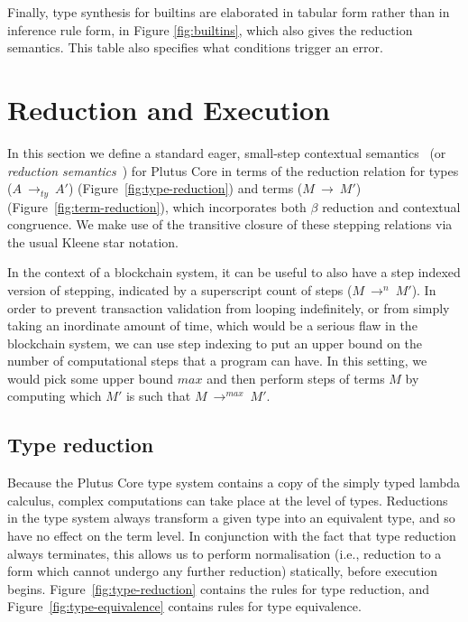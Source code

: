 \documentclass[a4paper]{article}
\newcommand{\typeStep}[2]{#1 ~ \rightarrow_{ty} ~ #2}
\newcommand{\step}[2]{#1 ~ \rightarrow ~ #2}
\newcommand{\multistepIndexed}[3]{#1 ~ \rightarrow^{#2} ~ #3}
\begin{document}
\noindent Finally, type synthesis for builtins are elaborated in tabular form
rather than in inference rule form, in Figure
\ref{fig:builtins}, which also gives the reduction
semantics. This table also specifies what conditions trigger an error.


\section{Reduction and Execution}
\label{sec:reduction}

In this section we define a standard eager,
small-step contextual semantics~\citep[5.3]{Harper:PFPL} (or
\textit{reduction semantics}~\citep[\S2]{Felleisen-Hieb}) for Plutus
Core in terms of the reduction relation for types
(\(\typeStep{A}{A'}\)) (Figure~\ref{fig:type-reduction}) 
and terms (\(\step{M}{M'}\)) (Figure~\ref{fig:term-reduction}), which
incorporates both $\beta$ reduction and contextual congruence. We make
use of the transitive closure of these stepping relations via the
usual Kleene star notation.

In the context of a blockchain system, it can be useful to also have a
step indexed version of stepping, indicated by a superscript count of
steps (\(\multistepIndexed{M}{n}{M'}\)). In order to prevent
transaction validation from looping indefinitely, or from simply
taking an inordinate amount of time, which would be a serious
flaw in the blockchain system, we can use step indexing to put an
upper bound on the number of computational steps that a program can
have. In this setting, we would pick some upper bound $\mathit{max}$
and then perform steps of terms $M$ by computing which $M'$ is such
that \(\multistepIndexed{M}{\mathit{max}}{M'}\).



\subsection{Type reduction}
Because the Plutus Core type system contains a copy of the simply
typed lambda calculus, complex computations can take place at the
level of types.  Reductions in the type system always transform a
given type into an equivalent type, and so have no effect on the term
level.  In conjunction with the fact that type reduction always
terminates, this allows us to perform normalisation (i.e., reduction to
a form which cannot undergo any further reduction) statically, before
execution begins.  Figure~\ref{fig:type-reduction} contains the rules
for type reduction, and Figure~\ref{fig:type-equivalence} contains
rules for type equivalence.
\end{document}
